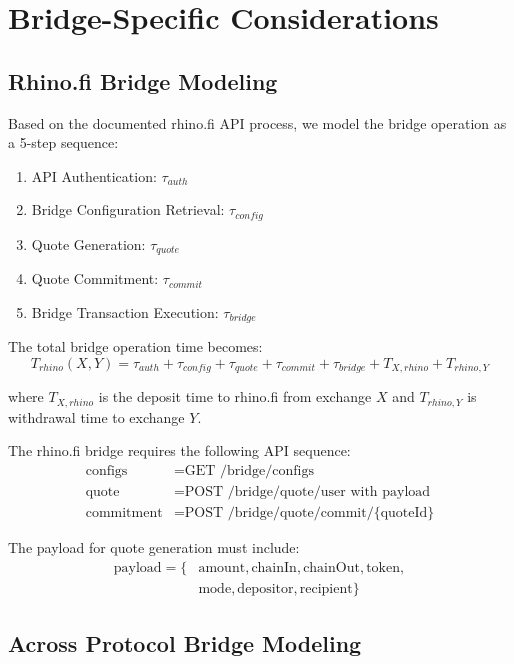 \documentclass{article}
\begin{document}
\section{Bridge-Specific Considerations}

\subsection{Rhino.fi Bridge Modeling}

Based on the documented rhino.fi API process, we model the bridge operation as a 5-step sequence:

\begin{enumerate}
    \item API Authentication: $\tau_{auth}$
    \item Bridge Configuration Retrieval: $\tau_{config}$
    \item Quote Generation: $\tau_{quote}$
    \item Quote Commitment: $\tau_{commit}$
    \item Bridge Transaction Execution: $\tau_{bridge}$
\end{enumerate}

The total bridge operation time becomes:
\begin{equation}
T_{rhino}(X,Y) = \tau_{auth} + \tau_{config} + \tau_{quote} + \tau_{commit} + \tau_{bridge} + T_{X,rhino} + T_{rhino,Y}
\end{equation}

where $T_{X,rhino}$ is the deposit time to rhino.fi from exchange $X$ and $T_{rhino,Y}$ is withdrawal time to exchange $Y$.

The rhino.fi bridge requires the following API sequence:
\begin{align}
\text{configs} &= \text{GET /bridge/configs} \\
\text{quote} &= \text{POST /bridge/quote/user with payload} \\
\text{commitment} &= \text{POST /bridge/quote/commit/\{quoteId\}}
\end{align}

The payload for quote generation must include:
\begin{align}
\text{payload} = \{&\text{amount}, \text{chainIn}, \text{chainOut}, \text{token}, \\
&\text{mode}, \text{depositor}, \text{recipient}\}
\end{align}

\subsection{Across Protocol Bridge Modeling}
\end{document}
